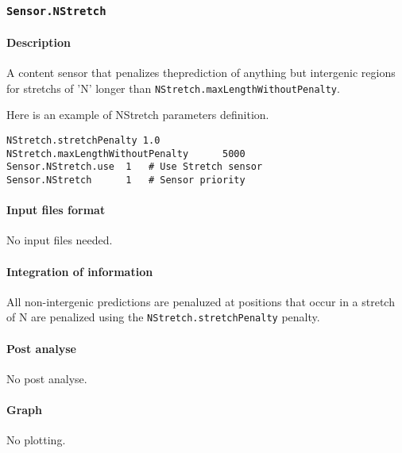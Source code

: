 
\subsubsection{\texttt{Sensor.NStretch}}

\paragraph{Description}

A content sensor that penalizes theprediction of anything but
intergenic regions for stretchs of 'N' longer than
\texttt{NStretch.maxLengthW\-ithoutPenalty}.

Here is an example of NStretch parameters definition.
\begin{Verbatim}[fontsize=\small]
NStretch.stretchPenalty 1.0
NStretch.maxLengthWithoutPenalty      5000
Sensor.NStretch.use  1   # Use Stretch sensor
Sensor.NStretch      1   # Sensor priority
\end{Verbatim}

\paragraph{Input files format}

No input files  needed.

\paragraph{Integration of information}

All non-intergenic predictions are penaluzed at positions that occur
in a stretch of N are penalized using the
\texttt{NStretch.str\-etchPenalty} penalty.

\paragraph{Post analyse}

No post analyse.

\paragraph{Graph}

No plotting.

